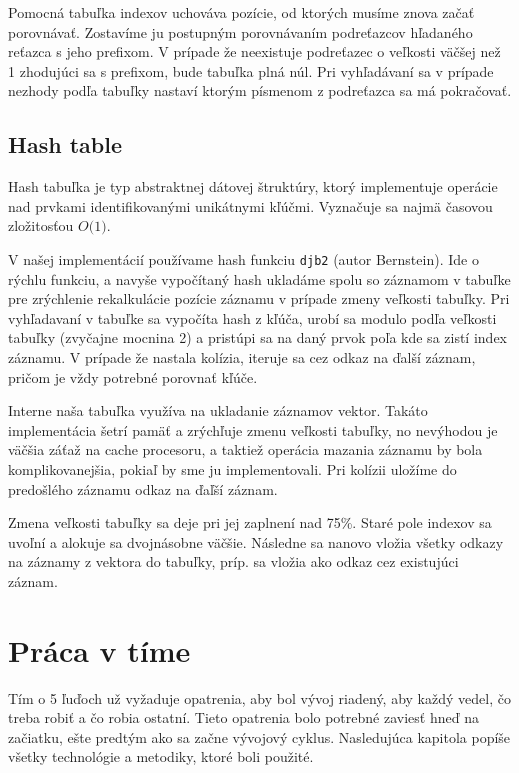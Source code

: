 \documentclass[12pt,a4paper,titlepage,final]{article}
\newcommand{\BigO}[1]{\ensuremath{O\bigl(#1\bigr)}}
\begin{document}
Pomocná tabuľka indexov uchováva pozície, od ktorých musíme znova začať porovnávať.
 Zostavíme ju postupným porovnávaním podreťazcov hľadaného reťazca s
 jeho prefixom. V prípade že neexistuje podreťazec o veľkosti väčšej než 1
 zhodujúci sa s prefixom, bude tabuľka plná núl. Pri vyhľadávaní sa v prípade nezhody podľa tabuľky
 nastaví ktorým písmenom z podreťazca sa má pokračovať.

\subsection{Hash table}
Hash tabuľka je typ abstraktnej dátovej štruktúry, ktorý implementuje operácie
 nad prvkami identifikovanými unikátnymi kľúčmi. Vyznačuje sa najmä časovou
 zložitosťou \BigO{1}.

 V našej implementácií používame hash funkciu \texttt{djb2} (autor Bernstein). Ide o
 rýchlu funkciu, a navyše vypočítaný hash ukladáme spolu so
 záznamom v tabuľke pre zrýchlenie rekalkulácie pozície záznamu v prípade
 zmeny veľkosti tabuľky. Pri vyhľadavaní v tabuľke sa vypočíta hash z kľúča,
 urobí sa modulo podľa veľkosti tabuľky (zvyčajne mocnina 2) a pristúpi sa na daný prvok
 poľa kde sa zistí index záznamu. V prípade že nastala kolízia, iteruje sa cez odkaz na ďalší záznam, 
 pričom je vždy potrebné porovnať kľúče.

Interne naša tabuľka využíva na ukladanie záznamov vektor. Takáto implementácia
 šetrí pamäť a zrýchľuje zmenu veľkosti tabuľky, no nevýhodou je väčšia záťaž na
 cache procesoru, a taktiež operácia mazania záznamu by bola komplikovanejšia,
 pokiaľ by sme ju implementovali. Pri kolízii uložíme do predošlého záznamu
 odkaz na ďaľší záznam.

Zmena veľkosti tabuľky sa deje pri jej zaplnení nad 75\%. Staré pole indexov sa uvoľní a
 alokuje sa dvojnásobne väčšie. Následne sa nanovo vložia všetky odkazy na
 záznamy z vektora do tabuľky, príp. sa vložia ako odkaz cez existujúci záznam.

\section{Práca v tíme}
Tím o 5 ľuďoch už vyžaduje opatrenia, aby bol vývoj riadený, aby každý vedel, čo treba robiť a
čo robia ostatní. Tieto opatrenia bolo potrebné zaviesť hneď na začiatku, ešte predtým ako sa
začne vývojový cyklus. Nasledujúca kapitola popíše všetky technológie a metodiky, ktoré boli použité.
\end{document}
